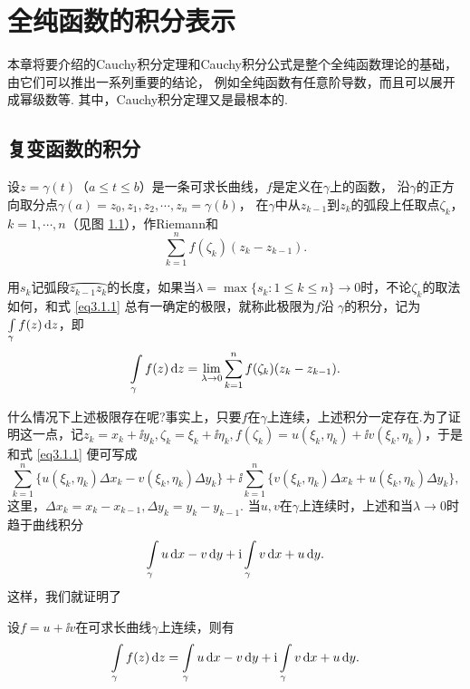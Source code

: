 \chapter{全纯函数的积分表示\label{chap3}}

本章将要介绍的Cauchy积分定理和Cauchy积分公式是整个全纯函数理论的基础，由它们可以推出一系列重要的结论，
例如全纯函数有任意阶导数，而且可以展开成幂级数等. 其中，Cauchy积分定理又是最根本的.


\section{复变函数的积分\label{sec3.1}}

设$z=\gamma(t)$（$a\le t\le b$）是一条可求长曲线，$f$是定义在$\gamma$上的函数，
沿$\gamma$的正方向取分点$\gamma(a)=z_0,z_1,z_2,\cdots,z_n=\gamma(b)$，
在$\gamma$中从$z_{k-1}$到$z_k$的弧段上任取点$\zeta_k$， $k=1,\cdots,n$（见图 \ref{fig3.1}），作Riemann和
\begin{equation}\label{eq3.1.1}
  \sum_{k=1}^n f(\zeta_k) (z_k - z_{k-1}).
\end{equation}
\begin{figure}[!ht]
  \centering
  \caption{\label{fig3.1}}
\end{figure}
用$s_k$记弧段$\wideparen{z_{k-1}z_k}$的长度，如果当$\lambda=\max\{s_k:1\le k\le n\}\to0$时，不论$\zeta_k$的取法如何，和式 \eqref{eq3.1.1} 总有一确定的极限，就称此极限为$f$沿
$\gamma$的积分，记为$\int\limits_\gamma f(z)\mathop{}\!\mathrm dz$，即
\[
  \int\limits_\gamma f(z)\mathop{}\!\mathrm dz = \lim_{\lambda\to0}\sum_{k=1}^nf(\zeta_k)(z_k-z_{k-1}).
\]

什么情况下上述极限存在呢?事实上，只要$f$在$\gamma$上连续，上述积分一定存在.为了证明这一点，记$z_k=x_k+\ii y_k,\zeta_k=\xi_k+\ii\eta_k,f(\zeta_k)=u(\xi_k,\eta_k)+\ii v(\xi_k,\eta_k)$，于是和式 \eqref{eq3.1.1} 便可写成
\[
  \sum_{k=1}^n\{u(\xi_k,\eta_k)\Delta x_k-v(\xi_k,\eta_k)\Delta y_k\}
  +\ii\sum_{k=1}^n\{v(\xi_k,\eta_k)\Delta x_k+u(\xi_k,\eta_k)\Delta y_k\},
\]
这里，$\Delta x_k=x_k-x_{k-1},\Delta y_k=y_k-y_{k-1}$. 当$u,v$在$\gamma$上连续时，上述和当$\lambda\to0$时趋于曲线积分
\[
  \int\limits_\gamma u\mathop{}\!\mathrm dx-v\mathop{}\!\mathrm dy+\mathrm i\int\limits_\gamma v\mathop{}\!\mathrm dx+u\mathop{}\!\mathrm dy.
\]
这样，我们就证明了
\begin{prop}\label{prop3.1.1}
设$f=u+\ii v$在可求长曲线$\gamma$上连续，则有
\begin{equation}\label{eq3.1.2}
  \int\limits_\gamma f(z)\mathop{}\!\mathrm dz=\int\limits_\gamma u\mathop{}\!\mathrm dx-v\mathop{}\!\mathrm dy+\mathrm i\int\limits_\gamma v\mathop{}\!\mathrm dx+u\mathop{}\!\mathrm dy.
\end{equation}
\end{prop}

